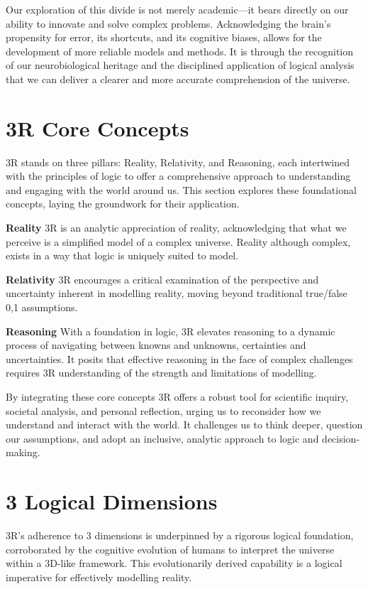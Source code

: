 \documentclass[12pt]{article}
\begin{document}
Our exploration of this divide is not merely academic—it bears directly on our ability to innovate and solve complex problems. Acknowledging the brain's propensity for error, its shortcuts, and its cognitive biases, allows for the development of more reliable models and methods. It is through the recognition of our neurobiological heritage and the disciplined application of logical analysis that we can deliver a clearer and more accurate comprehension of the universe.

\section*{3R Core Concepts}

3R stands on three pillars: Reality, Relativity, and Reasoning, each intertwined with the principles of \qbit{} logic to offer a comprehensive approach to understanding and engaging with the world around us. This section explores these foundational concepts, laying the groundwork for their application.

\textbf{Reality}
3R is an analytic appreciation of reality, acknowledging that what we perceive is a simplified model of a complex universe. Reality although complex, exists in a way that \qbit{} logic is uniquely suited to model.

\textbf{Relativity}
3R encourages a critical examination of the perspective and uncertainty inherent in modelling reality, moving beyond traditional true/false {0,1} assumptions.

\textbf{Reasoning}
With a foundation in \qbit{} logic, 3R elevates reasoning to a dynamic process of navigating between knowns and unknowns, certainties and uncertainties. It posits that effective reasoning in the face of complex challenges requires 3R understanding of the strength and limitations of modelling.

By integrating these core concepts 3R offers a robust tool for scientific inquiry, societal analysis, and personal reflection, urging us to reconsider how we understand and interact with the world. It challenges us to think deeper, question our assumptions, and adopt an inclusive, analytic approach to logic and decision-making.

\section*{3 Logical Dimensions}
3R's adherence to 3 dimensions is underpinned by a rigorous logical foundation, corroborated by the cognitive evolution of humans to interpret the universe within a 3D-like framework. This evolutionarily derived capability is a logical imperative for effectively modelling reality.
\end{document}

